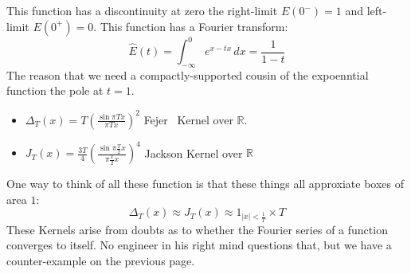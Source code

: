 \documentclass[12pt]{article}
\begin{document}
This function has a discontinuity at zero the right-limit $E(0^-) = 1$ and left-limit $E(0^+)=0$.  This function has a Fourier transform:
$$ \hat{E}(t) = \int_{-\infty}^0 e^{x - tx} \, dx = \frac{1}{1-t}$$
The reason that we need a compactly-supported cousin of the expoenntial function the pole at $t=1$. 
\begin{itemize}
\item $\displaystyle \Delta_T(x) = T \left( \frac{\sin \pi T x}{\pi T x} \right)^2$ \;\;Fejer \;\;\, Kernel over $\mathbb{R}$.  
\item $\displaystyle J_T(x) = \frac{3T}{4} \left( \frac{\sin \pi \frac{T}{2} x}{\pi \frac{T}{2} x}\right)^4$ Jackson Kernel over $\mathbb{R}$
\end{itemize}
One way to think of all these function is that these things all approxiate boxes of area $1$:
$$ \Delta_T(x) \approx J_T(x) \approx  1_{|x| < \frac{1}{T}} \times T $$
These Kernels arise from doubts as to whether the Fourier series of a function converges to itself.  No engineer in his right mind questions that, but we have a counter-example on the previous page.
\end{document}
